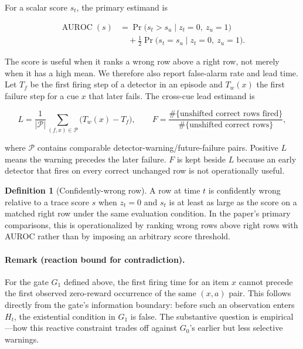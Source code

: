 \documentclass[pdflatex,sn-basic]{sn-jnl}
\theoremstyle{definition}
\newtheorem{definition}{Definition}
\newenvironment{eqbox}%
{\par\vspace{9pt}\noindent\begin{lrbox}{\eqsavebox}\begin{minipage}{\dimexpr\linewidth-18pt}\boldmath}%
{\end{minipage}\end{lrbox}\setlength{\fboxsep}{8pt}\noindent\colorbox{eqgrey}{\usebox{\eqsavebox}}\par\vspace{7pt}}
\begin{document}
For a scalar score $s_t$, the primary estimand is

\begin{eqbox}
\begin{align*}
\operatorname{AUROC}(s)&=\Pr\bigl(s_t>s_u\mid z_t=0,\ z_u=1\bigr)\\
&\quad+\frac{1}{2}\Pr\bigl(s_t=s_u\mid z_t=0,\ z_u=1\bigr).
\end{align*}
\end{eqbox}

The score is useful when it ranks a wrong row above a right row, not merely when it has a high
mean. We therefore also report false-alarm rate and lead time. Let $T_f$ be the first firing
step of a detector in an episode and $T_w(x)$ the first failure step for a cue $x$ that later
fails. The cross-cue lead estimand is

\begin{eqbox}
\[
L=\frac{1}{|\mathcal{P}|}\sum_{(f,x)\in\mathcal{P}}
\bigl(T_w(x)-T_f\bigr),
\qquad
F=\frac{\#\{\text{unshifted correct rows fired}\}}
{\#\{\text{unshifted correct rows}\}},
\]
\end{eqbox}

where $\mathcal{P}$ contains comparable detector-warning/future-failure pairs. Positive $L$
means the warning precedes the later failure. $F$ is kept beside $L$ because an early detector
that fires on every correct unchanged row is not operationally useful.

\begin{definition}[Confidently-wrong row]
\label{def:confidentwrong}
A row at time $t$ is confidently wrong relative to a trace score $s$ when $z_t=0$ and
$s_t$ is at least as large as the score on a matched right row under the same evaluation
condition. In the paper's primary comparisons, this is operationalized by ranking wrong rows
above right rows with AUROC rather than by imposing an arbitrary score threshold.
\end{definition}

\paragraph{Remark (reaction bound for contradiction).}
For the gate $G_1$ defined above, the first firing time for an item $x$ cannot precede the
first observed zero-reward occurrence of the same $(x,a)$ pair. This follows directly from
the gate's information boundary: before such an observation enters $H_t$, the existential
condition in $G_1$ is false. The substantive question is empirical---how this reactive
constraint trades off against $G_0$'s earlier but less selective warnings.
\end{document}
